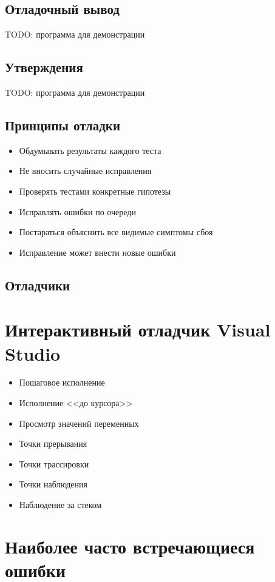 \documentclass[14pt,openany]{book}
\begin{document}
\section{Отладочный вывод}

TODO: программа для демонстрации

\section{Утверждения}

TODO: программа для демонстрации

\section{Принципы отладки}

\begin{itemize}
\item Обдумывать результаты каждого теста
\item Не вносить случайные исправления
\item Проверять тестами конкретные гипотезы
\item Исправлять ошибки по очереди
\item Постараться объяснить все видимые симптомы сбоя
\item Исправление может внести новые ошибки
\end{itemize}

\section{Отладчики}

\chapter{Интерактивный отладчик Visual Studio}

\begin{itemize}
\item Пошаговое исполнение
\item Исполнение <<до курсора>>
\item Просмотр значений переменных
\item Точки прерывания
\item Точки трассировки
\item Точки наблюдения
\item Наблюдение за стеком
\end{itemize}

\chapter{Наиболее часто встречающиеся ошибки}
\end{document}
